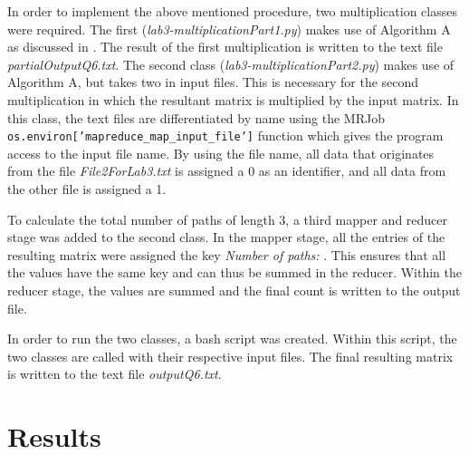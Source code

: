 \documentclass[10pt,twocolumn]{witseiepaper}
\begin{document}
In order to implement the above mentioned procedure, two multiplication classes were required. The first (\textit{lab3-multiplicationPart1.py}) makes use of Algorithm A as discussed in . The result of the first multiplication is written to the text file \textit{partialOutputQ6.txt}. The second class (\textit{lab3-multiplicationPart2.py}) makes use of Algorithm A, but takes two in input files. This is necessary for the second multiplication in which the resultant matrix is multiplied by the input matrix. In this class, the text files are differentiated by name using the MRJob \texttt{os.environ['mapreduce\_map\_input\_file']} function which gives the program access to the input file name. By using the file name, all data that originates from the file \textit{File2ForLab3.txt} is assigned a 0 as an identifier, and all data from the other file is assigned a 1.

To calculate the total number of paths of length 3, a third mapper and reducer stage was added to the second class. In the mapper stage, all the entries of the resulting matrix were assigned the key \textit{Number of paths: }. This ensures that all the values have the same key and can thus be summed in the reducer. Within the reducer stage, the values are summed and the final count is written to the output file.

In order to run the two classes, a bash script was created. Within this script, the two classes are called with their respective input files. The final resulting matrix is written to the text file \textit{outputQ6.txt}. 

\section{Results}


%
\end{document}
